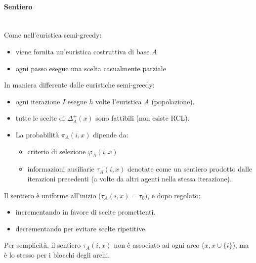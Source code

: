 \documentclass{article}
\begin{document}
\paragraph{Sentiero}\mbox{}\\
Come nell'euristica semi-greedy:
\begin{itemize}
    \item viene fornita un'euristica costruttiva di base $A$
    \item ogni passo esegue una scelta casualmente parziale
\end{itemize}
In maniera differente dalle euristiche semi-greedy:
\begin{itemize}
    \item ogni iterazione $I$ esegue $h$ volte l'euristica $A$ (popolazione).
    \item tutte le scelte di $\Delta_A^+(x)$ sono fattibili (non esiste RCL).
    \item La probabilità $\pi_A(i,x)$ dipende da:
          \begin{itemize}
              \item criterio di selezione $\varphi_A(i,x)$
              \item informazioni ausiliarie $\tau_A(i,x)$ denotate come un sentiero prodotto dalle
                    iterazioni precedenti (a volte da altri agenti nella stessa iterazione).
          \end{itemize}
\end{itemize}
Il sentiero è uniforme all'inizio ($\tau_A(i,x)=\tau_0)$, e dopo regolato:
\begin{itemize}
    \item incrementando in favore di scelte promettenti.
    \item decrementando per evitare scelte ripetitive.
\end{itemize}
Per semplicità, il sentiero $\tau_A(i,x)$ non è associato ad ogni arco ($x,x\cup\{i\}$), ma è lo
stesso per i blocchi degli archi.
\end{document}
